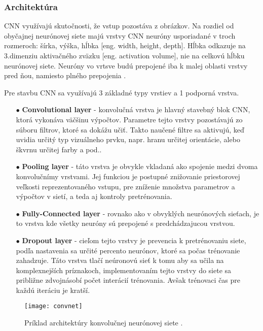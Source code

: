 \subsubsection{Architektúra}
CNN využívajú skutočnosti, že vstup pozostáva z obrázkov.
Na rozdiel od obyčajnej neurónovej siete majú vrstvy CNN neuróny usporiadané v troch rozmeroch: šírka, výška, hĺbka [eng. width, height, depth].
Hĺbka odkazuje na 3.dimenziu aktivačného zväzku [eng. activation volume], nie na celkovú hĺbku neurónovej siete.
Neuróny vo vrtsve budú prepojené iba k malej oblasti vrstvy pred ňou, namiesto plného prepojenia \cite{odkaz:CNNArchitecture}.

Pre stavbu CNN sa využívajú 3 základné typy vrstiev a 1 podporná vrstva.
\begin{enumerate}
    \item[$\bullet$] \textbf{Convolutional layer} - konvolučná vrstva je hlavný stavebný blok CNN, ktorá vykonáva väčšinu výpočtov.
    Parametre tejto vrstvy pozostávajú zo súboru filtrov, ktoré sa dokážu učiť.
    Takto naučené filtre sa aktivujú, keď uvidia určitý typ vizuálneho prvku, napr. hranu určitej orientácie, alebo škvrnu určitej farby a pod..
    \item[$\bullet$] \textbf{Pooling layer} - táto vrstva je obvykle vkladaná ako spojenie medzi dvoma konvolučnímy vrstvami.
    Jej funkciou je postupné znižovanie priestorovej veľkosti reprezentovaného vstupu, pre zníženie množstva parametrov a výpočtov v sietí, a teda aj kontroly pretrénovania.
    \item[$\bullet$] \textbf{Fully-Connected layer} - rovnako ako v obvyklých neurónových sieťach, je to vrstva kde všetky neuróny sú prepojené s predchádzajucou vrstvou.
    \item[$\bullet$] \textbf{Dropout layer} - cieľom tejto vrstvy je prevencia k pretrénovaniu siete, podľa nastavenia sa určité percento neurónov, ktoré sa počas trénovanie zahadzuje.
    Táto vrstva tlačí neúronovú sieť k tomu aby sa učila na komplexnejších príznakoch, implementovaním tejto vrstvy do siete sa približne zdvojnásobí počet interácií trénovania.
    Avšak trénovaci čas pre každú iteráciu je kratší.
\end{enumerate}

\begin{figure}[H]
	\centering
	\texttt{[image: convnet]}
	\caption{Príklad architektúry konvolučnej neurónovej siete \cite{odkaz:CNNArchitecture}.}
	\label{pic:CNNExample}
\end{figure}

